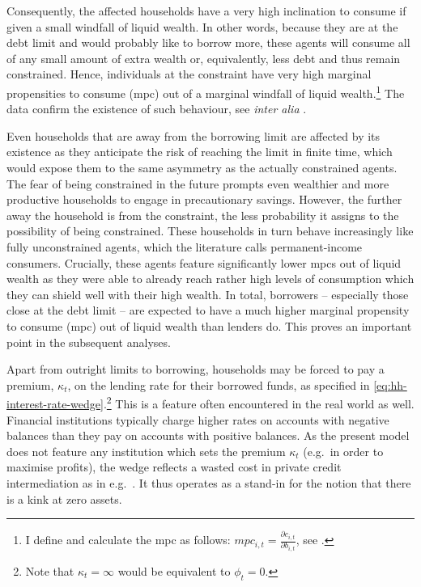 \documentclass[12pt]{article} %
\numberwithin{equation}{section} %
\numberwithin{figure}{section}
\numberwithin{table}{section}
\begin{document}
Consequently, the affected households have a very high inclination to consume if given a small windfall of liquid wealth. In other words, because they are at the debt limit and would probably like to borrow more, these agents will consume all of any small amount of extra wealth or, equivalently, less debt and thus remain constrained. Hence, individuals at the constraint have very high marginal propensities to consume (\Gls{mpc}) out of a marginal windfall of liquid wealth.\footnote{I define and calculate the \Gls{mpc} as follows: $mpc_{i,t} = \frac{\partial c_{i,t}}{\partial b_{i,t}}$, see \textcite{gl2017}.} The data confirm the existence of such behaviour, see \textit{inter alia} \textcite{gross2002}.

Even households that are away from the borrowing limit are affected by its existence as they anticipate the risk of reaching the limit in finite time, which would expose them to the same asymmetry as the actually constrained agents. The fear of being constrained in the future prompts even wealthier and more productive households to engage in precautionary savings. However, the further away the household is from the constraint, the less probability it assigns to the possibility of being constrained. These households in turn behave increasingly like fully unconstrained agents, which the literature calls permanent-income consumers. Crucially, these agents feature significantly lower \Gls{mpc}s out of liquid wealth as they were able to already reach rather high levels of consumption which they can shield well with their high wealth. In total, borrowers -- especially those close at the debt limit -- are expected to have a much higher marginal propensity to consume (\Gls{mpc}) out of liquid wealth than lenders do. This proves an important point in the subsequent analyses.

Apart from outright limits to borrowing, households may be forced to pay a premium, $\kappa_t$, on the lending rate for their borrowed funds, as specified in \eqref{eq:hh-interest-rate-wedge}.\footnote{Note that $\kappa_t = \infty$ would be equivalent to $\phi_t=0$.} This is a feature often encountered in the real world as well. Financial institutions typically charge higher rates on accounts with negative balances than they pay on accounts with positive balances. As the present model does not feature any institution which sets the premium $\kappa_t$ (e.g.~in order to maximise profits), the wedge reflects a wasted cost in private credit intermediation as in e.g.~\textcite{bayer2023}. It thus operates as a stand-in for the notion that there is a kink at zero assets.
\end{document}
